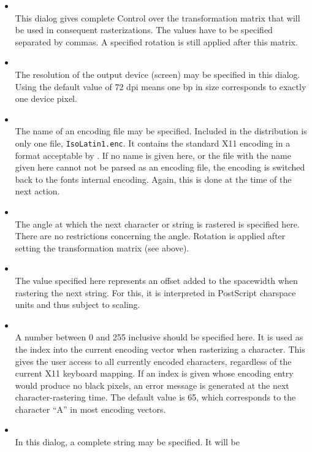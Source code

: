 \begin{itemize}
\item {}\\
  This dialog gives complete Control over the transformation matrix that will
  be used in consequent rasterizations. The values have to be specified
  separated by commas. A specified rotation is still applied after this
  matrix.  
\item {}\\
  The resolution of the output device (screen) may be specified in
  this dialog. Using the default value of 72 dpi means one bp in size
  corresponds to exactly one device pixel. 
\item {}\\
  The name of an encoding file may be specified. Included in the
  distribution is only one file, \verb+IsoLatin1.enc+. It contains the
  standard X11 encoding in a format acceptable by \tonelib. If no name
  is given here, or the file with the name given here cannot not be
  parsed as an encoding file, the encoding is switched back to the fonts
  internal encoding. Again, this is done at the time of the next
  action. 
\item {}\\
  The angle at which the next character or string is rastered is
  specified here. There are no restrictions concerning the angle. Rotation is
  applied after setting the transformation matrix (see above).
\item {}\\
  The value specified here represents an offset added to the
  spacewidth when rastering the next string. For this, it is
  interpreted in PostScript charspace units and thus subject to
  scaling. 
\item {}\\
  A number between 0 and 255 inclusive should be specified here. It is
  used as the index into the current encoding vector when rasterizing
  a character. This gives the user access to all currently encoded
  characters, regardless of the current X11 keyboard mapping. If an
  index is given whose encoding entry would produce no black pixels,
  an error message is generated at the next character-rastering
  time. The default value is 65, which corresponds 
  to the character ``A'' in most encoding vectors.
\item {}\\
  In this dialog, a complete string may be specified. It will be

\end{itemize}
